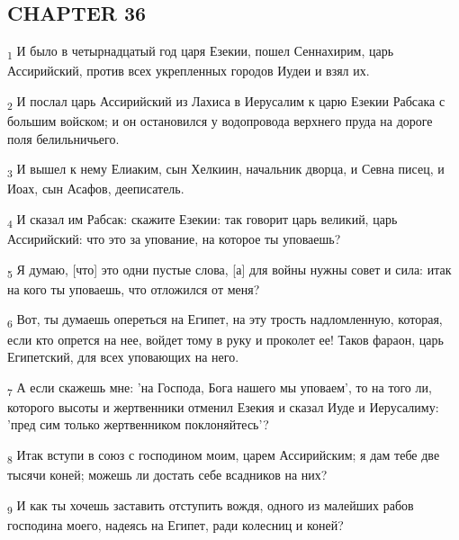 \subsection{CHAPTER 36}
\begin{tcolorbox}
\textsubscript{1} И было в четырнадцатый год царя Езекии, пошел Сеннахирим, царь Ассирийский, против всех укрепленных городов Иудеи и взял их.
\end{tcolorbox}
\begin{tcolorbox}
\textsubscript{2} И послал царь Ассирийский из Лахиса в Иерусалим к царю Езекии Рабсака с большим войском; и он остановился у водопровода верхнего пруда на дороге поля белильничьего.
\end{tcolorbox}
\begin{tcolorbox}
\textsubscript{3} И вышел к нему Елиаким, сын Хелкиин, начальник дворца, и Севна писец, и Иоах, сын Асафов, дееписатель.
\end{tcolorbox}
\begin{tcolorbox}
\textsubscript{4} И сказал им Рабсак: скажите Езекии: так говорит царь великий, царь Ассирийский: что это за упование, на которое ты уповаешь?
\end{tcolorbox}
\begin{tcolorbox}
\textsubscript{5} Я думаю, [что] это одни пустые слова, [а] для войны нужны совет и сила: итак на кого ты уповаешь, что отложился от меня?
\end{tcolorbox}
\begin{tcolorbox}
\textsubscript{6} Вот, ты думаешь опереться на Египет, на эту трость надломленную, которая, если кто опрется на нее, войдет тому в руку и проколет ее! Таков фараон, царь Египетский, для всех уповающих на него.
\end{tcolorbox}
\begin{tcolorbox}
\textsubscript{7} А если скажешь мне: 'на Господа, Бога нашего мы уповаем', то на того ли, которого высоты и жертвенники отменил Езекия и сказал Иуде и Иерусалиму: 'пред сим только жертвенником поклоняйтесь'?
\end{tcolorbox}
\begin{tcolorbox}
\textsubscript{8} Итак вступи в союз с господином моим, царем Ассирийским; я дам тебе две тысячи коней; можешь ли достать себе всадников на них?
\end{tcolorbox}
\begin{tcolorbox}
\textsubscript{9} И как ты хочешь заставить отступить вождя, одного из малейших рабов господина моего, надеясь на Египет, ради колесниц и коней?
\end{tcolorbox}
